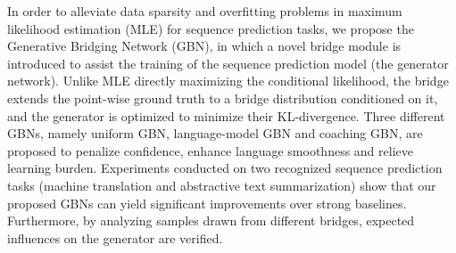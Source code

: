 In order to alleviate data sparsity and overfitting problems in maximum likelihood estimation (MLE) for sequence prediction tasks, we propose the Generative Bridging Network (GBN), in which a novel bridge module is introduced to assist the training of the sequence prediction model (the generator network). Unlike MLE directly maximizing the conditional likelihood, the bridge extends the point-wise ground truth to a bridge distribution conditioned on it, and the generator is optimized to minimize their KL-divergence. Three different GBNs, namely uniform GBN, language-model GBN and coaching GBN, are proposed to penalize confidence, enhance language smoothness and relieve learning burden. Experiments conducted on two recognized sequence prediction tasks (machine translation and abstractive text summarization) show that our proposed GBNs can yield significant improvements over strong baselines. Furthermore, by analyzing samples drawn from different bridges, expected influences on the generator are verified.
